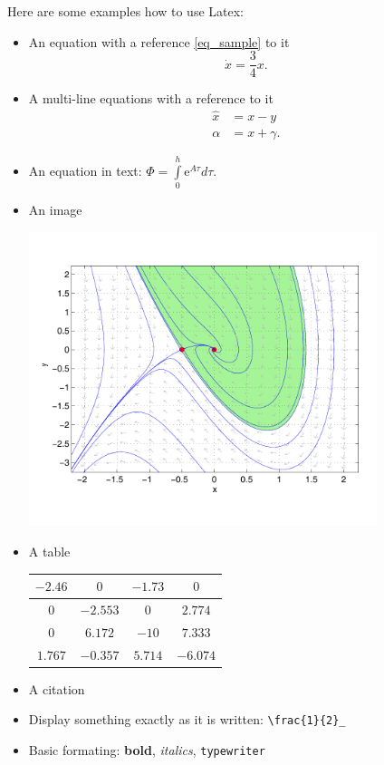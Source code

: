 \documentclass[a4paper,12pt,oneside,onecolumn]{article} %
\begin{document}
Here are some examples how to use Latex:
\begin{itemize}
 \item An equation with a reference \eqref{eq_sample} to it
 \begin{equation}
  \dot{x} = \frac{3}{4} x. \label{eq_sample}
 \end{equation}
 \item A multi-line equations with a reference to it
 \begin{align*}
  \hat{x} &= x - y\\
  \alpha &= x + \gamma.
 \end{align*}
 \item An equation in text: $\Phi = \int\limits_{0}^{h} \mathrm{e}^{A\tau} d \tau$.
 \item An image
 \begin{center}
  \includegraphics[width = 0.8\textwidth]{Phase_portrait_with_regionmark}
 \end{center}
 \item A table
 
 \begin{tabular}{@{\vrule height 10.5pt depth4pt  width0pt}|c|c|c|c|}
    \hline
     $-2.46$ & $0$ & $-1.73$ & $0$ \\ \hline
     $0$ & $-2.553$ & $0$ & $2.774$ \\ \hline
     $0$ & $6.172$ & $-10$ & $7.333$ \\ \hline
     $1.767$ & $-0.357$ & $5.714$ & $-6.074$ \\ \hline
  \end{tabular}
  \item A citation \cite{Oetiker:2008:TheNotSoShortIntroductiontoLaTeXe}
  \item Display something exactly as it is written: \verb|\frac{1}{2}_|
  \item Basic formating: \textbf{bold}, \textit{italics}, \texttt{typewriter}
\end{itemize}
\end{document}
